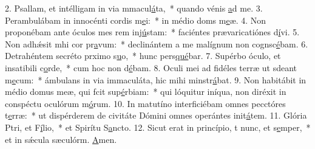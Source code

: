 2. Psallam, et intélligam in via mmacul\uline{á}ta,~* quando vénis \uline{a}d me.
3. Perambulábam in innocénti cordis m\uline{e}i:~* in médio doms m\uline{e}æ.
4. Non proponébam ante óculos mes rem inj\uline{ú}stam:~* faciéntes prævaricatiónes d\uline{í}vi.
5. Non adhǽsit mhi cor pr\uline{a}vum:~* declinántem a me malígnum non cognsc\uline{é}bam.
6. Detrahéntem secréto prximo s\uline{u}o,~* hunc pers\uline{qué}bar.
7. Supérbo óculo, et insatibili c\uline{o}rde,~* cum hoc non d\uline{é}bam.
8. Oculi mei ad fidéles terræ ut sdeant m\uline{e}cum:~* ámbulans in via immaculáta, hic mihi minstr\uline{á}bat.
9. Non habitábit in médio domus meæ, qui fcit sup\uline{é}rbiam:~* qui lóquitur iníqua, non diréxit in conspéctu oculórum m\uline{ó}rum.
10. In matutíno interficiébam omnes pecctóres t\uline{e}rræ:~* ut dispérderem de civitáte Dómini omnes operántes init\uline{á}tem.
11. Glória Ptri, et F\uline{í}lio,~* et Spirítu S\uline{a}ncto.
12. Sicut erat in princípio, t nunc, et s\uline{e}mper,~* et in sǽcula sæculórm. \uline{A}men.
